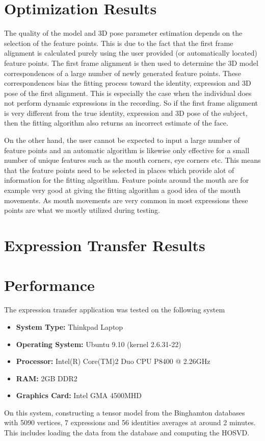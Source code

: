 \documentclass[11pt,a4paper,twoside]{report}
\begin{document}
\section{Optimization Results}
The quality of the model and 3D pose parameter estimation depends on the
selection of the feature points. This is due to the fact that the first frame
alignment is calculated purely using the user provided (or automatically
located) feature points. The first frame alignment is then used to determine the
3D model correspondences of a
large number of newly generated feature points. These correspondences bias the
fitting process toward the identity, expression and 3D pose of the first
alignment. This is especially the case when the individual does not perform
dynamic expressions in the recording. So if the first frame alignment is
very different from the true identity, expression and 3D pose of the subject, then the fitting algorithm also returns an incorrect estimate of the face.

On the other hand, the user cannot be expected to input a large number of
feature points and an automatic algorithm is likewise only effective for a small
number of unique features such as the mouth corners, eye corners etc. This means
that the feature points need to be selected in places which provide alot of
information for the fitting algorithm. Feature points around the mouth are for
example very good at giving the fitting algorithm a good idea of the mouth
movements. As mouth movements are very common in most expressions these points
are what we mostly utilized during testing.
\section{Expression Transfer Results}

\section{Performance}
The expression transfer application was tested on the following system
\begin{itemize}
\item \textbf{System Type:} Thinkpad Laptop
\item \textbf{Operating System:} Ubuntu 9.10 (kernel 2.6.31-22)
\item \textbf{Processor:} Intel(R) Core(TM)2 Duo CPU P8400 @ 2.26GHz
\item \textbf{RAM:} 2GB DDR2
\item \textbf{Graphics Card:} Intel GMA 4500MHD
\end{itemize}
On this system, constructing a tensor model from the Binghamton databases with
5090 vertices, 7 expressions and 56 identities averages at around 2 minutes. This
includes loading the data from the database and computing the HOSVD.
\end{document}
